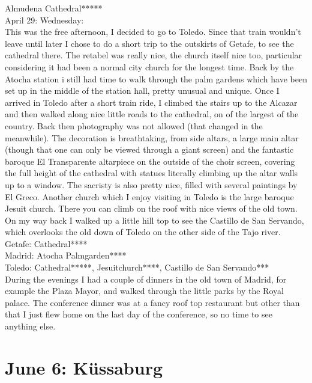 Almudena Cathedral*****\\

April 29: Wednesday:\\
This was the free afternoon, I decided to go to Toledo. Since that train wouldn't leave until later I chose to do a short trip to the outskirts of Getafe, to see the cathedral there. The retabel was really nice, the church itself nice too, particular considering it had been a normal city church for the longest time. Back by the Atocha station i still had time to walk through the palm gardens which have been set up in the middle of the station hall, pretty unusual and unique. Once I arrived in Toledo after a short train ride, I climbed the stairs up to the Alcazar and then walked along nice little roads to the cathedral, on of the largest of the country. Back then photography was not allowed (that changed in the meanwhile). The decoration is breathtaking, from side altars, a large main altar (though that one can only be viewed through a giant screen) and the fantastic baroque El Transparente altarpiece on the outside of the choir screen, covering the full height of the cathedral with statues literally climbing up the altar walls up to a window. The sacristy is also pretty nice, filled with several paintings by El Greco. Another church which I enjoy visiting in Toledo is the large baroque Jesuit church. There you can climb on the roof with nice views of the old town. On my way back I walked up a little hill top to see the Castillo de San Servando, which overlooks the old down of Toledo on the other side of the Tajo river.\\

Getafe: Cathedral****\\
Madrid: Atocha Palmgarden****\\
Toledo: Cathedral*****, Jesuitchurch****, Castillo de San Servando***\\

During the evenings I had a couple of dinners in the old town of Madrid, for example the Plaza Mayor, and walked through the little parks by the Royal palace. The conference dinner was at a fancy roof top restaurant but other than that I just flew home on the last day of the conference, so no time to see anything else.

\section{June 6: K\"ussaburg}
\label{2009:Kuessaburg}

